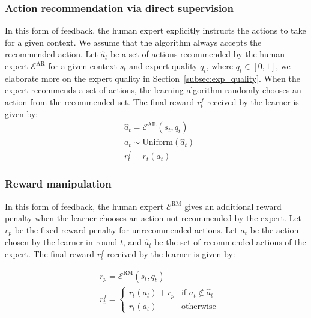 \subsubsection{Action recommendation via direct supervision}
\label{sec:action_recommendation}


In this form of feedback, the human expert explicitly instructs the actions to take for a given context. We assume that the algorithm always accepts the recommended action. Let $\hat{a}_t$ be a set of actions recommended by the human expert $\mathcal{E}^{\mathrm{AR}}$ for a given context $s_t$ and expert quality $q_t$, where $q_t\in [0,1]$, we elaborate more on the expert quality in Section~\ref{subsec:exp_quality}.  When the expert recommends a set of actions, the learning algorithm randomly chooses an action from the recommended set. 
The final reward $r_t^f$ received by the learner is given by: 
\begin{align}
    &\hat{a}_t = \mathcal{E}^{\mathrm{AR}}(s_t,q_t) \\
    &a_t\sim\mathrm{Uniform}(\hat a_t)\\
    &r_t^f = r_t(a_t)
\end{align}

\subsubsection{Reward manipulation}

\label{sec:reward_penalty}
In this form of feedback, the human expert $\mathcal E^{\mathrm{RM}}$ gives an additional reward penalty when the learner chooses an action not recommended by the expert. Let $r_p$ be the fixed reward penalty for unrecommended actions. Let $a_t$ be the action chosen by the learner in round $t$, and $\hat{a}_t$ be the set of recommended actions of the expert. The final reward $r_t^f$ received by the learner is given by:

\begin{align}
    &r_p=\mathcal{E}^{\mathrm{RM}}(s_t,q_t)\\
    &r_t^f = \begin{cases}
        r_t(a_t) + r_p & \text{if } a_t \notin \hat{a}_t \\
        r_t(a_t) & \text{otherwise}
    \end{cases}
\end{align}


